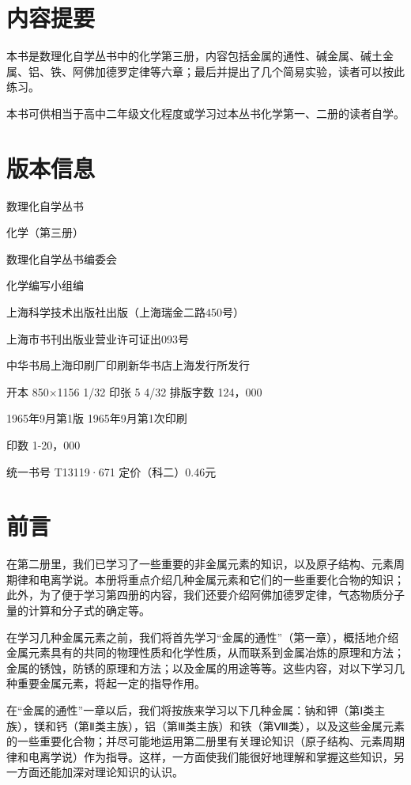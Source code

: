 \chapter*{内容提要}

本书是数理化自学丛书中的化学第三册，内容包括金属的通性、碱金属、碱土金属、铝、铁、阿佛加德罗定律等六章；最后并提出了几个简易实验，读者可以按此练习。

本书可供相当于高中二年级文化程度或学习过本丛书化学第一、二册的读者自学。

\chapter*{版本信息}

数理化自学丛书

化学（第三册）

数理化自学丛书编委会

化学编写小组编

上海科学技术出版社出版（上海瑞金二路450号）

上海市书刊出版业营业许可证出093号

中华书局上海印刷厂印刷新华书店上海发行所发行

开本 850×1156 1/32 印张 5 4/32 排版字数 124，000

1965年9月第1版 1965年9月第1次印刷

印数 1-20，000

统一书号 T13119·671 定价（科二）0.46元

\chapter{前言}

在第二册里，我们已学习了一些重要的非金属元素的知识，以及原子结构、元素周期律和电离学说。本册将重点介绍几种金属元素和它们的一些重要化合物的知识；此外，为了便于学习第四册的内容，我们还要介绍阿佛加德罗定律，气态物质分子量的计算和分子式的确定等。

在学习几种金属元素之前，我们将首先学习``金属的通性''（第一章），概括地介绍金属元素具有的共同的物理性质和化学性质，从而联系到金属冶炼的原理和方法；金属的锈蚀，防锈的原理和方法；以及金属的用途等等。这些内容，对以下学习几种重要金属元素，将起一定的指导作用。

在``金属的通性''一章以后，我们将按族来学习以下几种金属：钠和钾（第Ⅰ类主族），镁和钙（第Ⅱ类主族），铝（第Ⅲ类主族）和铁（第Ⅷ类），以及这些金属元素的一些重要化合物；并尽可能地运用第二册里有关理论知识（原子结构、元素周期律和电离学说）作为指导。这样，一方面使我们能很好地理解和掌握这些知识，另一方面还能加深对理论知识的认识。

